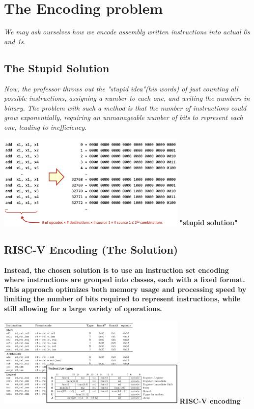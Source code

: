 \section{The Encoding problem}
\textit{We may ask ourselves how we encode assembly written instructions into actual 0s and 1s.} \newline
\subsection{The Stupid Solution}
\textit{Now, the professor throws out the "stupid idea"(his words) of just counting all possible instructions, assigning a number to each one, and writing the numbers in binary. The problem with such a method is that the number of instructions could grow exponentially, requiring an unmanageable number of bits to represent each one, leading to inefficiency.} \newline 
\begin{center}
    \includegraphics[width=0.7\textwidth]{chapters/chapter1/images/encoding.png}
    \centering
    \textbf{"stupid solution"}
\end{center}

\subsection{RISC-V Encoding (The Solution)}
\textbf{Instead, the chosen solution is to use an instruction set encoding where instructions are grouped into classes, each with a fixed format. This approach optimizes both memory usage and processing speed by limiting the number of bits required to represent instructions, while still allowing for a large variety of operations.} \newline
\begin{center}
    \includegraphics[width=0.7\textwidth]{chapters/chapter1/images/riscv.png}
    \centering
    \textbf{RISC-V encoding}
\end{center}

